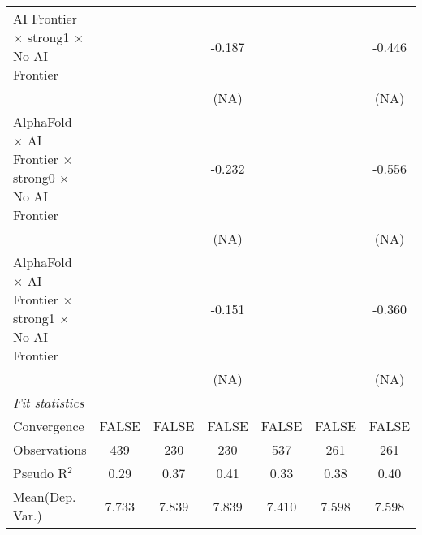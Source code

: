 \begin{tabular}{lcccccc}
   AI Frontier $\times$ strong1 $\times$ No AI Frontier                       &                        &        & -0.187 &                        &       & -0.446\\   
                                                                              &                        &        & (NA)   &                        &       & (NA)\\   
   AlphaFold $\times$ AI Frontier $\times$ strong0 $\times$ No AI Frontier    &                        &        & -0.232 &                        &       & -0.556\\   
                                                                              &                        &        & (NA)   &                        &       & (NA)\\   
   AlphaFold $\times$ AI Frontier $\times$ strong1 $\times$ No AI Frontier    &                        &        & -0.151 &                        &       & -0.360\\   
                                                                              &                        &        & (NA)   &                        &       & (NA)\\   
   \midrule
   \emph{Fit statistics}\\
   Convergence                                                                &FALSE                   & FALSE  & FALSE  & FALSE                  & FALSE & FALSE\\  
   Observations                                                               & 439                    & 230    & 230    & 537                    & 261   & 261\\  
   Pseudo R$^2$                                                               & 0.29                   & 0.37   & 0.41   & 0.33                   & 0.38  & 0.40\\  
Mean(Dep. Var.) & 7.733 & 7.839 & 7.839 & 7.410 & 7.598 & 7.598 \\
   

\end{tabular}
